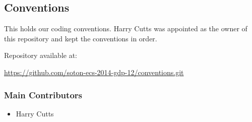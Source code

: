 \subsection{Conventions}
\label{Section:Repo_conventions}

This holds our coding conventions. Harry Cutts was appointed as the owner of this repository and kept the conventions in order.

Repository available at:

\url{https://github.com/soton-ecs-2014-gdp-12/conventions.git}

\subsubsection{Main Contributors}
\begin{itemize}
  \item Harry Cutts
\end{itemize}
